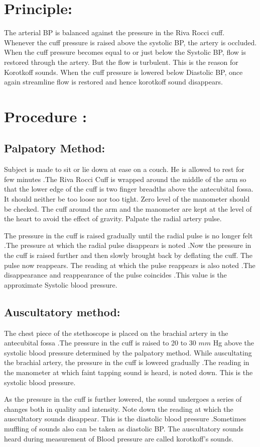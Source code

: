 \documentclass[a4paper,12pt,openany,twoside]{book}
\begin{document}
\section*{Principle:}
The arterial BP is balanced against the pressure in the Riva Rocci cuff. Whenever the cuff pressure is raised above the systolic BP, the artery is occluded. When the cuff pressure becomes equal to or just below the Systolic BP, flow is restored through the artery. But the flow is turbulent. This is the reason for Korotkoff sounds. When the cuff pressure is lowered below Diastolic BP, once again streamline flow is restored and hence korotkoff sound disappears.
\section*{Procedure :}
\subsection*{Palpatory Method:}
Subject is made to sit or lie down at ease on a couch. He is allowed to rest for few minutes .The Riva Rocci Cuff is wrapped around the middle of the arm so that the lower edge of the cuff is two finger breadths above the antecubital fossa. It should neither be too loose nor too tight. Zero level of the manometer should be checked. The cuff around the arm and the manometer are kept at the level of the heart to avoid the effect of gravity. Palpate the radial artery pulse.
\par
The pressure in the cuff is raised gradually until the radial pulse is no longer felt .The pressure at which the radial pulse disappears is noted .Now the pressure in the cuff is raised further and then slowly brought back by deflating the cuff. The pulse now reappears. The reading at which the pulse reappears is also noted .The disappearance and reappearance of the pulse coincides .This value is the approximate Systolic blood pressure.
\subsection*{Auscultatory method:}
The chest piece of the stethoscope is placed on the brachial artery in the antecubital fossa .The pressure in the cuff is raised to 20 to 30 $mm$ Hg above the systolic blood pressure determined by the palpatory method. While auscultating the brachial artery, the pressure in the cuff is lowered gradually .The reading in the manometer at which faint tapping sound is heard, is noted down. This is the systolic blood pressure.
\par
As the pressure in the cuff is further lowered, the sound undergoes a series of changes both in quality and intensity. Note down the reading at which the auscultatory sounds disappear. This is the diastolic blood pressure .Sometimes muffling of sounds also can be taken as diastolic BP. The auscultatory sounds heard during measurement of Blood pressure are called korotkoff’s sounds.
\end{document}
